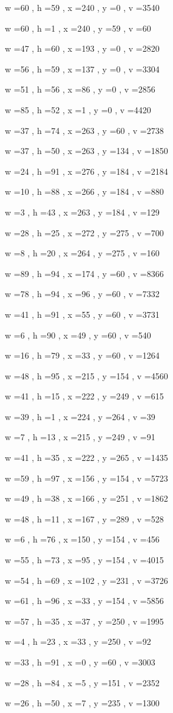 \documentclass[11pt]{article}
\begin{document}
w =60 , h =59 , x =240 , y =0 , v =3540
\par
w =60 , h =1 , x =240 , y =59 , v =60
\par
w =47 , h =60 , x =193 , y =0 , v =2820
\par
w =56 , h =59 , x =137 , y =0 , v =3304
\par
w =51 , h =56 , x =86 , y =0 , v =2856
\par
w =85 , h =52 , x =1 , y =0 , v =4420
\par
w =37 , h =74 , x =263 , y =60 , v =2738
\par
w =37 , h =50 , x =263 , y =134 , v =1850
\par
w =24 , h =91 , x =276 , y =184 , v =2184
\par
w =10 , h =88 , x =266 , y =184 , v =880
\par
w =3 , h =43 , x =263 , y =184 , v =129
\par
w =28 , h =25 , x =272 , y =275 , v =700
\par
w =8 , h =20 , x =264 , y =275 , v =160
\par
w =89 , h =94 , x =174 , y =60 , v =8366
\par
w =78 , h =94 , x =96 , y =60 , v =7332
\par
w =41 , h =91 , x =55 , y =60 , v =3731
\par
w =6 , h =90 , x =49 , y =60 , v =540
\par
w =16 , h =79 , x =33 , y =60 , v =1264
\par
w =48 , h =95 , x =215 , y =154 , v =4560
\par
w =41 , h =15 , x =222 , y =249 , v =615
\par
w =39 , h =1 , x =224 , y =264 , v =39
\par
w =7 , h =13 , x =215 , y =249 , v =91
\par
w =41 , h =35 , x =222 , y =265 , v =1435
\par
w =59 , h =97 , x =156 , y =154 , v =5723
\par
w =49 , h =38 , x =166 , y =251 , v =1862
\par
w =48 , h =11 , x =167 , y =289 , v =528
\par
w =6 , h =76 , x =150 , y =154 , v =456
\par
w =55 , h =73 , x =95 , y =154 , v =4015
\par
w =54 , h =69 , x =102 , y =231 , v =3726
\par
w =61 , h =96 , x =33 , y =154 , v =5856
\par
w =57 , h =35 , x =37 , y =250 , v =1995
\par
w =4 , h =23 , x =33 , y =250 , v =92
\par
w =33 , h =91 , x =0 , y =60 , v =3003
\par
w =28 , h =84 , x =5 , y =151 , v =2352
\par
w =26 , h =50 , x =7 , y =235 , v =1300
\par
\newpage
\end{document}
